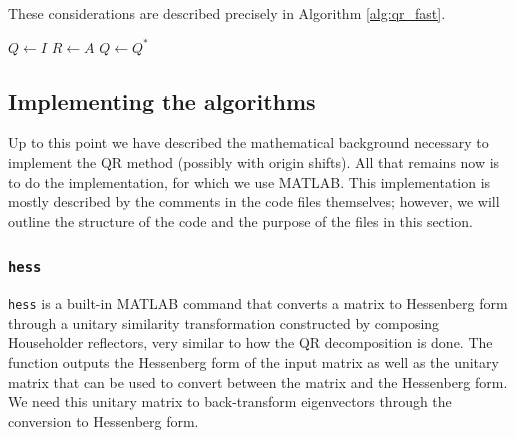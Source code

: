 \documentclass{article}
\begin{document}
These considerations are described precisely in Algorithm \ref{alg:qr_fast}.

\begin{algorithm}[htb!]
	\caption{QR Decomposition for Hessenberg Matrices}
	\label{alg:qr_fast}
	$Q \gets I$
	$R \gets A$\;
	$Q \gets Q^*$
\end{algorithm}

\subsection{Implementing the algorithms}

Up to this point we have described the mathematical background necessary to implement the QR method (possibly with origin shifts). All that remains now is to do the implementation, for which we use MATLAB. This implementation is mostly described by the comments in the code files themselves; however, we will outline the structure of the code and the purpose of the files in this section.

\subsubsection*{\texttt{hess}}
\texttt{hess} is a built-in MATLAB command that converts a matrix to Hessenberg form through a unitary similarity transformation constructed by composing Householder reflectors, very similar to how the QR decomposition is done. The function outputs the Hessenberg form of the input matrix as well as the unitary matrix that can be used to convert between the matrix and the Hessenberg form. We need this unitary matrix to back-transform eigenvectors through the conversion to Hessenberg form.
\end{document}
